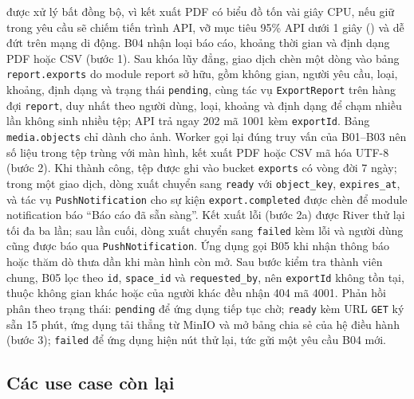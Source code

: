  được xử lý bất đồng bộ, vì kết xuất PDF có biểu đồ tốn vài giây CPU, nếu giữ trong yêu cầu sẽ chiếm tiến trình API, vỡ mục tiêu 95\% API dưới 1 giây () và dễ đứt trên mạng di động. B04 nhận loại báo cáo, khoảng thời gian và định dạng PDF hoặc CSV (bước 1). Sau khóa lũy đẳng, giao dịch chèn một dòng vào bảng \texttt{report.exports} do module report sở hữu, gồm không gian, người yêu cầu, loại, khoảng, định dạng và trạng thái \texttt{pending}, cùng tác vụ \texttt{ExportReport} trên hàng đợi \texttt{report}, duy nhất theo người dùng, loại, khoảng và định dạng để chạm nhiều lần không sinh nhiều tệp; API trả ngay 202 mã 1001 kèm \texttt{exportId}. Bảng \texttt{media.objects} chỉ dành cho ảnh. Worker gọi lại đúng truy vấn của B01--B03 nên số liệu trong tệp trùng với màn hình, kết xuất PDF hoặc CSV mã hóa UTF-8 (bước 2). Khi thành công, tệp được ghi vào bucket \texttt{exports} có vòng đời 7 ngày; trong một giao dịch, dòng xuất chuyển sang \texttt{ready} với \texttt{object\_key}, \texttt{expires\_at}, và tác vụ \texttt{PushNotification} cho sự kiện \texttt{export.completed} được chèn để module notification báo “Báo cáo đã sẵn sàng”. Kết xuất lỗi (bước 2a) được River thử lại tối đa ba lần; sau lần cuối, dòng xuất chuyển sang \texttt{failed} kèm lỗi và người dùng cũng được báo qua \texttt{PushNotification}. Ứng dụng gọi B05 khi nhận thông báo hoặc thăm dò thưa dần khi màn hình còn mở. Sau bước kiểm tra thành viên chung, B05 lọc theo \texttt{id}, \texttt{space\_id} và \texttt{requested\_by}, nên \texttt{exportId} không tồn tại, thuộc không gian khác hoặc của người khác đều nhận 404 mã 4001. Phản hồi phân theo trạng thái: \texttt{pending} để ứng dụng tiếp tục chờ; \texttt{ready} kèm URL \texttt{GET} ký sẵn 15 phút, ứng dụng tải thẳng từ MinIO và mở bảng chia sẻ của hệ điều hành (bước 3); \texttt{failed} để ứng dụng hiện nút thử lại, tức gửi một yêu cầu B04 mới.


\subsection{Các use case còn lại}\label{sssec:ht-con-lai}


